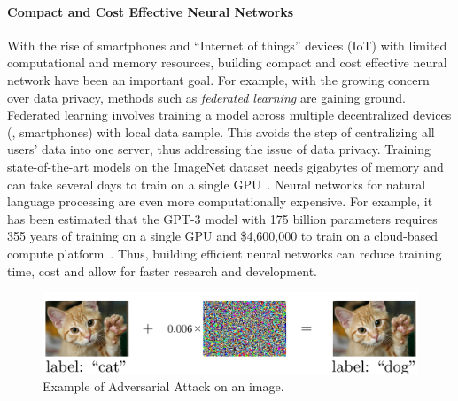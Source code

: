 

\paragraph{Compact and Cost Effective Neural Networks}

With the rise of smartphones and ``Internet of things'' devices (IoT) with limited computational and memory resources, building compact and cost effective neural network have been an important goal.
For example, with the growing concern over data privacy, methods such as \emph{federated learning} are gaining ground.
Federated learning involves training a model across multiple decentralized devices (\eg, smartphones) with local data sample. 
This avoids the step of centralizing all users' data into one server, thus addressing the issue of data privacy.  
Training state-of-the-art models on the ImageNet dataset needs gigabytes of memory and can take several days to train on a single GPU~\cite{krizhevsky2012imagenet}. 
Neural networks for natural language processing are even more computationally expensive.
For example, it has been estimated that the GPT-3 model with 175 billion parameters requires 355 years of training on a single GPU and \$4,600,000 to train on a cloud-based compute platform~\cite{li2020overview}.
Thus, building efficient neural networks can reduce training time, cost and allow for faster research and development.


\begin{figure}[t]
  \centering
  \includegraphics[width=\textwidth]{figures/main/ch1-introduction/ExampleAdversarialCatDog.pdf}
  \caption{Example of Adversarial Attack on an image.}
  \label{figure:ch1-adversarial_image_example}
\end{figure}


